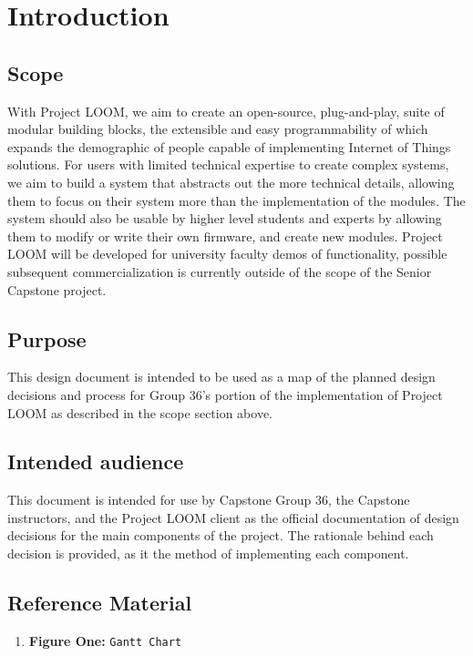 \documentclass[onecolumn, draftclsnofoot,10pt, compsoc]{IEEEtran}
\begin{document}
\section{Introduction}
\subsection{Scope}  
With Project LOOM, we aim to create an open-source, plug-and-play, suite of modular building blocks, the extensible and easy programmability of which expands the demographic of people capable of implementing Internet of Things solutions. For users with limited technical expertise to create complex systems, we aim to build a system that abstracts out the more technical details, allowing them to focus on their system more than the implementation of the modules. The system should also be usable by higher level students and experts by allowing them to modify or write their own firmware, and create new modules. Project LOOM will be developed for university faculty demos of functionality, possible subsequent commercialization is currently outside of the scope of the Senior Capstone project.

\subsection{Purpose}
This design document is intended to be used as a map of the planned design decisions and process for Group 36's portion of the implementation of Project LOOM as described in the scope section above.
                
\subsection{Intended audience}
This document is intended for use by Capstone Group 36, the Capstone instructors, and the Project LOOM client as the official documentation of design decisions for the main components of the project. The rationale behind each decision is provided, as it the method of implementing each component.

\subsection{Reference Material}
    \begin{enumerate}
        \item \textbf{Figure One:} \texttt{Gantt Chart}
    \end{enumerate}
\end{document}
